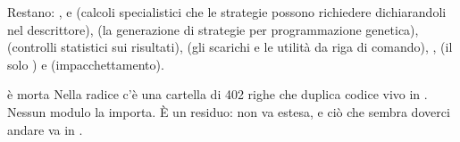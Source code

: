 Restano: ,  e  (calcoli
specialistici che le strategie possono richiedere dichiarandoli nel
descrittore),  (la generazione di strategie per programmazione
genetica),  (controlli statistici sui risultati),
 (gli scarichi e le utilità da riga di comando), ,
 (il solo ) e  (impacchettamento).

\begin{attenzione}{ è morta}
Nella radice c'è una cartella  di \num{402} righe che duplica
codice vivo in \pkgLive. Nessun modulo la importa. È un residuo: non va
estesa, e ciò che sembra doverci andare va in .
\end{attenzione}

